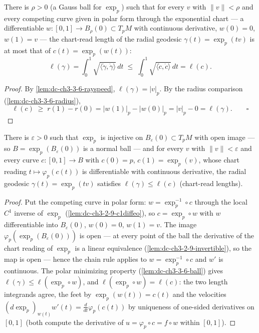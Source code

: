 \begin{lemma}
  \label{lem:dc-ch3-3-6-ball}
  \leanok
  There is $\rho>0$ (a Gauss ball for $\exp_p$) such that for every $v$ with
  $\|v\|<\rho$ and every competing curve given in polar form through the
  exponential chart — a differentiable $w:[0,1]\to B_\rho(0)\subset T_pM$ with
  continuous derivative, $w(0)=0$, $w(1)=v$ — the chart-read length of the
  radial geodesic $\gamma(t)=\exp_p(tv)$ is at most that of
  $c(t)=\exp_p(w(t))$:
  $$\ell(\gamma)=\int_0^1\sqrt{\langle\dot\gamma,\dot\gamma\rangle}\,dt
    \;\le\;\int_0^1\sqrt{\langle\dot c,\dot c\rangle}\,dt=\ell(c).$$
\end{lemma}
\begin{proof}
  \sketch
  \leanok
  By \cref{lem:dc-ch3-3-6-rayspeed}, $\ell(\gamma)=|v|_p$. By the radius
  comparison (\cref{lem:dc-ch3-3-6-radius}),
  $$\ell(c)\;\ge\;r(1)-r(0)=|w(1)|_p-|w(0)|_p=|v|_p-0=\ell(\gamma).
    \qquad\square$$
\end{proof}

\begin{lemma}
  \label{lem:dc-ch3-3-6-normal}
  \leanok
  There is $\varepsilon>0$ such that $\exp_p$ is injective on
  $B_\varepsilon(0)\subset T_pM$ with open image — so
  $B=\exp_p(B_\varepsilon(0))$ is a normal ball — and for every $v$ with
  $\|v\|<\varepsilon$ and every curve $c:[0,1]\to B$ with $c(0)=p$,
  $c(1)=\exp_p(v)$, whose chart reading $t\mapsto\varphi_p(c(t))$ is
  differentiable with continuous derivative, the radial geodesic
  $\gamma(t)=\exp_p(tv)$ satisfies $\ell(\gamma)\le\ell(c)$ (chart-read
  lengths).
\end{lemma}
\begin{proof}
  \sketch
  \leanok
  Put the competing curve in polar form: $w=\exp_p^{-1}\circ c$ through the
  local $C^1$ inverse of $\exp_p$ (\cref{lem:dc-ch3-2-9-c1diffeo}), so
  $c=\exp_p\circ w$ with $w$ differentiable into $B_\varepsilon(0)$,
  $w(0)=0$, $w(1)=v$. The image $\varphi_p(\exp_p(B_\varepsilon(0)))$ is open
  — at every point of the ball the derivative of the chart reading of
  $\exp_p$ is a linear equivalence (\cref{lem:dc-ch3-2-9-invertible}), so the
  map is open — hence the chain rule applies to $w=\exp_p^{-1}\circ c$ and
  $w'$ is continuous. The polar minimizing property
  (\cref{lem:dc-ch3-3-6-ball}) gives $\ell(\gamma)\le\ell(\exp_p\circ w)$,
  and $\ell(\exp_p\circ w)=\ell(c)$: the two length integrands agree, the
  feet by $\exp_p(w(t))=c(t)$ and the velocities
  $(d\exp_p)_{w(t)}w'(t)=\frac{d}{dt}\varphi_p(c(t))$ by uniqueness of
  one-sided derivatives on $[0,1]$ (both compute the derivative of
  $u=\varphi_p\circ c=f\circ w$ within $[0,1]$).
\end{proof}

